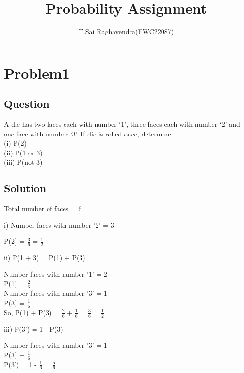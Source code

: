 \documentclass[journal,12pt,twocolumn]{IEEEtran}
\title{\mytitle}
\title{
Probability Assignment
}
\author{T.Sai Raghavendra(FWC22087)}
\begin{document}
\maketitle
\tableofcontents
\bigskip


\section{\textbf{Problem1}}
\subsection{\textbf{Question}}
A die has two faces each with number ‘1’, three faces each with number ‘2’ and
one face with number ‘3’. If die is rolled once, determine\\
(i) P(2) \\(ii) P(1 or 3) \\(iii) P(not 3)\\
\subsection{\textbf{Solution}}
Total number of faces = 6

i) Number faces with number '2' = 3
\begin{center}
	P(2) = $\frac{3}{6}$ = $\frac{1}{2}$
\end{center}
	
ii) P(1 + 3) = P(1) + P(3)
\begin{center}
	Number faces with number '1' = 2\\
	P(1) = $\frac{2}{6}$\\
	Number faces with number '3' = 1\\
	P(3) = $\frac{1}{6}$\\
	So, P(1) + P(3) = $\frac{2}{6}$ + $\frac{1}{6}$ = $\frac{3}{6}$ = $\frac{1}{2}$
\end{center}
	
iii) P(3') = 1 - P(3)
\begin{center}
	Number faces with number '3' = 1\\
	P(3) = $\frac{1}{6}$\\ 
	P(3') = 1 - $\frac{1}{6}$ = $\frac{5}{6}$
\end{center}
\end{document}

